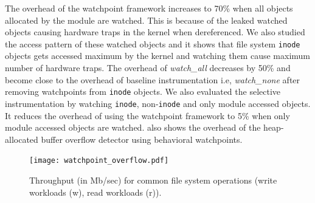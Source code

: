 \documentclass[letterpaper,twocolumn,10pt]{article}
\begin{document}
The overhead of the watchpoint framework increases to {\texttildelow}70\% when all objects allocated by the module are watched. This is because of the leaked watched objects causing hardware traps in the kernel when dereferenced. We also studied the access pattern of these watched objects and it shows that file system \texttt{inode} objects gets accessed maximum by the kernel and watching them cause maximum number of hardware traps. The overhead of \emph{watch\_all} decreases by {\texttildelow}50\% and become close to the overhead of baseline instrumentation i.e, \emph{watch\_none} after removing watchpoints from \texttt{inode} objects. We also evaluated the selective instrumentation by watching \texttt{inode}, non-\texttt{inode} and only module accessed objects. It reduces the overhead of using the watchpoint framework to {\texttildelow}5\% when only module accessed objects are watched.  
 also shows the overhead of the heap-allocated buffer overflow detector using behavioral watchpoints. %


\begin{figure}[t!]
\texttt{[image: watchpoint\_overflow.pdf]}
\vspace{-6pt}
\caption{\label{fig:iozone-workload-overhead} Throughput (in Mb/sec) for common file system operations (write workloads (w), read workloads (r)).}
\end{figure}








\end{document}
